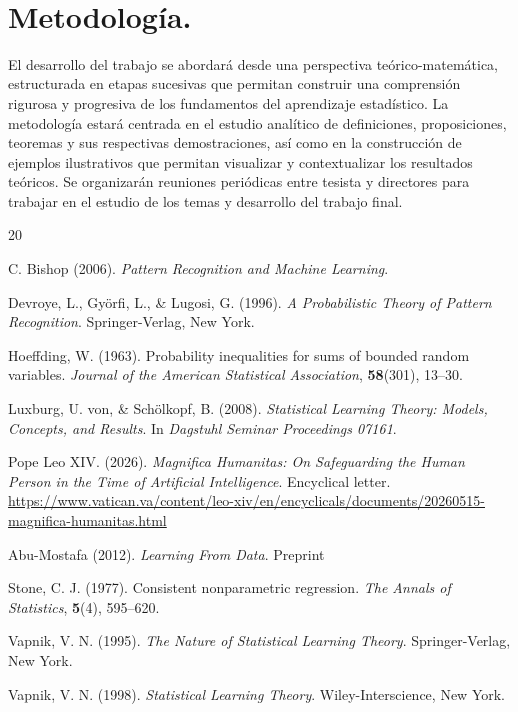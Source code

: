\documentclass[12pt]{article}
\begin{document}
\

\section{Metodología.}


El desarrollo del trabajo se abordará desde una perspectiva teórico-matemática, estructurada en etapas sucesivas que permitan construir una comprensión rigurosa y progresiva de los fundamentos del aprendizaje estadístico. La metodología estará centrada en el estudio analítico de definiciones, proposiciones, teoremas y sus respectivas demostraciones, así como en la construcción de ejemplos ilustrativos que permitan visualizar y contextualizar los resultados teóricos. Se organizarán reuniones periódicas entre tesista y directores para trabajar en el estudio de los temas y desarrollo del trabajo final.






\begin{thebibliography}{20}
\parskip=0.1cm

 C. Bishop  (2006). \textit{ Pattern Recognition and Machine Learning}.

 Devroye, L., Györfi, L., \& Lugosi, G. (1996). \textit{A Probabilistic Theory of Pattern Recognition}. Springer-Verlag, New York.

Hoeffding, W. (1963). Probability inequalities for sums of bounded random variables. \textit{Journal of the American Statistical Association}, \textbf{58}(301), 13–30.

 Luxburg, U. von, \& Schölkopf, B. (2008). \textit{Statistical Learning Theory: Models, Concepts, and Results}. In \textit{Dagstuhl Seminar Proceedings 07161}.

 Pope Leo XIV. (2026). \textit{Magnifica Humanitas: On Safeguarding the Human Person in the Time of Artificial Intelligence}. Encyclical letter. \url{https://www.vatican.va/content/leo-xiv/en/encyclicals/documents/20260515-magnifica-humanitas.html}

 Abu-Mostafa  (2012). \textit{Learning From Data}. Preprint

 Stone, C. J. (1977). Consistent nonparametric regression. \textit{The Annals of Statistics}, \textbf{5}(4), 595–620.

Vapnik, V. N. (1995). \textit{The Nature of Statistical Learning Theory}. Springer-Verlag, New York.

 Vapnik, V. N. (1998). \textit{Statistical Learning Theory}. Wiley-Interscience, New York.






\end{thebibliography}
\end{document}
